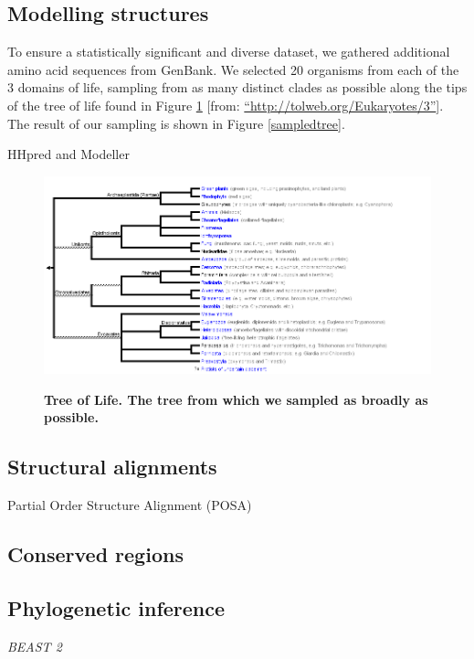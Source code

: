 \documentclass[10pt,letterpaper]{article}
\begin{document}
\subsection*{Modelling structures}
To ensure a statistically significant and diverse dataset, we gathered additional amino acid sequences from GenBank.  
We selected 20 organisms from each of the 3 domains of life, sampling from as many distinct clades as possible along the tips of the tree of life found in Figure \ref{treeoflife} [from: \hyperref[label_name]{``http://tolweb.org/Eukaryotes/3''}]. 
The result of our sampling is shown in Figure \ref{sampledtree}.

HHpred and Modeller


\begin{figure}
  \caption{\bf Tree of Life.  The tree from which we sampled as broadly as possible.}
  \centering
    \includegraphics[width=\textwidth]{Eukaryotes.png}
  \label{treeoflife}  
\end{figure}



\subsection*{Structural alignments}


Partial Order Structure Alignment (POSA)


\subsection*{Conserved regions}


\subsection*{Phylogenetic inference}

\textit{BEAST 2}
\end{document}

